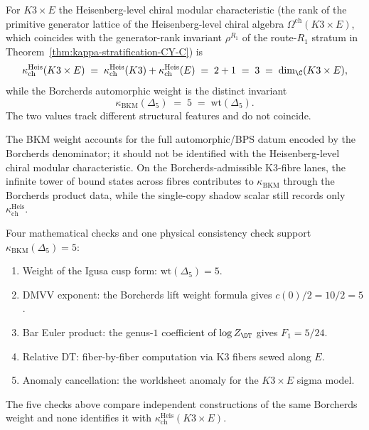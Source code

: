 \begin{proposition}
\label{prop:categorical-euler}
For $K3 \times E$ the Heisenberg-level chiral modular characteristic (the rank of the primitive generator lattice of the Heisenberg-level chiral algebra $\Omega^{\mathrm{ch}}(K3 \times E)$, which coincides with the generator-rank invariant $\rho^{R_1}$ of the route-$R_1$ stratum in Theorem~\ref{thm:kappa-stratification-CY-C}) is
\[
 \kappa_{\mathrm{ch}}^{\mathrm{Heis}}(K3 \times E) \;=\; \kappa_{\mathrm{ch}}^{\mathrm{Heis}}(K3) + \kappa_{\mathrm{ch}}^{\mathrm{Heis}}(E) \;=\; 2 + 1 \;=\; 3 \;=\; \dim_\C(K3 \times E),
\]
while the Borcherds automorphic weight is the distinct invariant
\[
 \kappa_{\mathrm{BKM}}(\Delta_5) \;=\; 5 \;=\; \mathrm{wt}(\Delta_5).
\]
The two values track different structural features and do not coincide.

The BKM weight accounts for the full automorphic/BPS datum encoded by the Borcherds denominator; it should not be identified with the Heisenberg-level chiral modular characteristic. On the Borcherds-admissible K3-fibre lanes, the infinite tower of bound states across fibres contributes to $\kappa_{\mathrm{BKM}}$ through the Borcherds product data, while the single-copy shadow scalar still records only $\kappa_{\mathrm{ch}}^{\mathrm{Heis}}$.

Four mathematical checks and one physical consistency check support $\kappa_{\mathrm{BKM}}(\Delta_5) = 5$:
\begin{enumerate}[label=\textup{(\alph*)}]
 \item Weight of the Igusa cusp form: $\mathrm{wt}(\Delta_5) = 5$.
 \item DMVV exponent: the Borcherds lift weight formula gives $c(0)/2 = 10/2 = 5$.
 \item Bar Euler product: the genus-$1$ coefficient of $\log Z_{\DT}$ gives $F_1 = 5/24$.
 \item Relative DT: fiber-by-fiber computation via K3 fibers sewed along $E$.
 \item Anomaly cancellation: the worldsheet anomaly for the $K3 \times E$ sigma model.
\end{enumerate}

The five checks above compare independent constructions of the same
Borcherds weight and none identifies it with
\(\kappa_{\mathrm{ch}}^{\mathrm{Heis}}(K3\times E)\).
\end{proposition}

